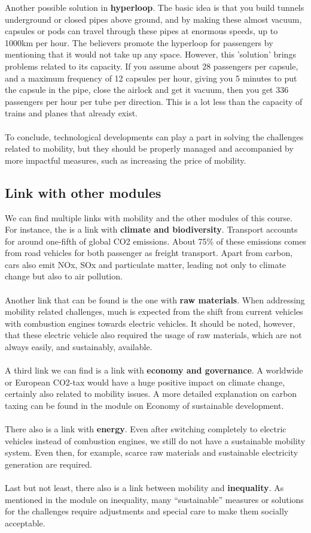\documentclass[../summary.tex]{subfiles}
\begin{document}
	 Another possible solution in \textbf{hyperloop}. The basic idea is that you build tunnels underground or closed pipes above ground, and by making these almost vacuum, capsules or pods can travel through these pipes at enormous speeds, up to 1000km per hour. The believers promote the hyperloop for passengers by mentioning that it would not take up any space. However, this 'solution' brings problems related to its capacity. If you assume about 28 passengers per capsule, and a maximum frequency of 12 capsules per hour, giving you 5 minutes to put the capsule in the pipe, close the airlock and get it vacuum, then you get 336 passengers per hour per tube per direction. This is a lot less than the capacity of trains and planes that already exist. 
	 \\\\
	 To conclude, technological developments can play a part in solving the challenges related to mobility, but they should be properly managed and accompanied by more impactful measures, such as increasing the price of mobility.
	\newpage
	
	\subsection{Link with other modules}
	
	We can find multiple links with mobility and the other modules of this course. For instance, the is a link with \textbf{climate and biodiversity}. Transport accounts for around one-fifth of global CO2 emissions. About 75\% of these emissions comes from road vehicles for both passenger as freight transport. Apart from carbon, cars also emit NOx, SOx and particulate matter, leading not only to climate change but also to air pollution. 
	\\\\
	Another link that can be found is the one with \textbf{raw materials}. When addressing mobility related challenges, much is expected from the shift from current vehicles with combustion engines towards electric vehicles. It should be noted, however, that these electric vehicle also required the usage of raw materials, which are not always easily, and sustainably, available. 
	\\\\
	A third link we can find is a link with \textbf{economy and governance}. A worldwide or European CO2-tax would have a huge positive impact on climate change, certainly also related to mobility issues. A more detailed explanation on carbon taxing can be found in the module on Economy of sustainable development. 
	\\\\
	There also is a link with \textbf{energy}. Even after switching completely to electric vehicles instead of combustion engines, we still do not have a sustainable mobility system. Even then, for example, scarce raw materials and sustainable electricity generation are required.
	\\\\
	Last but not least, there also is a link between mobility and \textbf{inequality}. As mentioned in the module on inequality, many “sustainable” measures or solutions for the challenges require adjustments and special care to make them socially acceptable.
	
\end{document}
